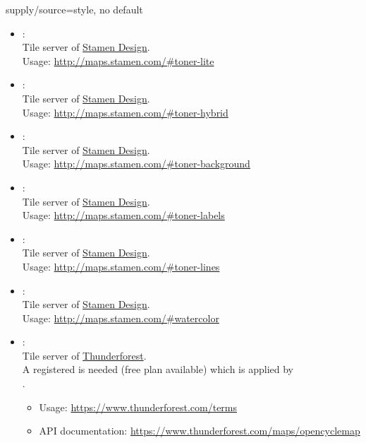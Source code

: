 \begin{docMrcKey}{supply/source}{=}{style, no default}
\begin{itemize}
\clearpage
  \item{}:\\
    Tile server of \href{http://stamen.com}{Stamen Design}.\\
    Usage: \url{http://maps.stamen.com/#toner-lite}

  \item{}:\\
    Tile server of \href{http://stamen.com}{Stamen Design}.\\
    Usage: \url{http://maps.stamen.com/#toner-hybrid}

  \item{}:\\
    Tile server of \href{http://stamen.com}{Stamen Design}.\\
    Usage: \url{http://maps.stamen.com/#toner-background}

\clearpage
  \item{}:\\
    Tile server of \href{http://stamen.com}{Stamen Design}.\\
    Usage: \url{http://maps.stamen.com/#toner-labels}

  \item{}:\\
    Tile server of \href{http://stamen.com}{Stamen Design}.\\
    Usage: \url{http://maps.stamen.com/#toner-lines}

  \item{}:\\
    Tile server of \href{http://stamen.com}{Stamen Design}.\\
    Usage: \url{http://maps.stamen.com/#watercolor}

\clearpage
  \item{}:\\
    Tile server of \href{https://www.thunderforest.com}{Thunderforest}.\\
    A registered  is needed (free plan available)
    which is applied by\\
    .
    \begin{itemize}
    \item Usage: \url{https://www.thunderforest.com/terms}
    \item API documentation: \url{https://www.thunderforest.com/maps/opencyclemap}
    \end{itemize}


\end{itemize}
\end{docMrcKey}
